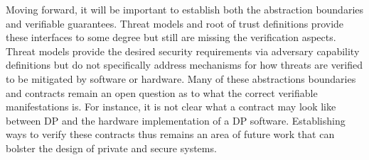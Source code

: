 Moving forward, it will be important to establish both the abstraction boundaries and verifiable guarantees.
Threat models and root of trust definitions provide these interfaces to some degree but still are missing the verification aspects.
Threat models provide the desired security requirements via adversary capability definitions but do not specifically address mechanisms for how threats are verified to be mitigated by software or hardware.
Many of these abstractions boundaries and contracts remain an open question as to what the correct verifiable manifestations is.
For instance, it is not clear what a contract may look like between DP and the hardware implementation of a DP software.
Establishing ways to verify these contracts thus remains an area of future work that can bolster the design of private and secure systems.
